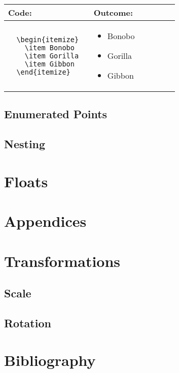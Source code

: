 \begin{tabular}{|p{0.46\linewidth}|p{0.46\linewidth}|}
  \hline
  \textbf{Code:} & \textbf{Outcome:} \\
  \hline
  \begin{verbatim}
  \begin{itemize}
    \item Bonobo
    \item Gorilla
    \item Gibbon
  \end{itemize}
  \end{verbatim}
  &
  \begin{itemize}
    \item Bonobo
    \item Gorilla
    \item Gibbon
  \end{itemize}
  \\
  \hline
\end{tabular}

\subsection{Enumerated Points}
\subsection{Nesting}

\section{Floats}

\section{Appendices}

\section{Transformations}
\subsection{Scale}
\subsection{Rotation}

\section{Bibliography}
